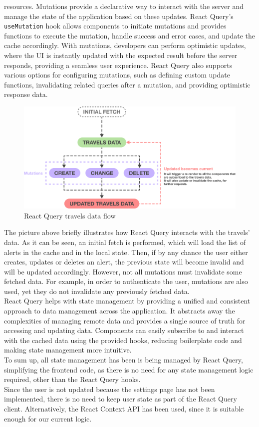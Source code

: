 \documentclass[./memory.tex]{subfiles}
\begin{document}
resources. Mutations provide a declarative way to interact with the server and
manage the state of the application based on these updates. React Query's
\texttt{useMutation} hook allows components to initiate mutations and provides
functions to execute the mutation, handle success and error cases, and update
the cache accordingly. With mutations, developers can perform optimistic
updates, where the UI is instantly updated with the expected result before the
server responds, providing a seamless user experience. React Query also supports
various options for configuring mutations, such as defining custom update
functions, invalidating related queries after a mutation, and providing
optimistic response data.
\begin{figure}[H]
	\centering
	\includegraphics[width=\textwidth]{./assets/react-query-travels.png}
	\caption{React Query travels data flow}
\end{figure}
The picture above briefly illustrates how React Query interacts with the
travels' data. As it can be seen, an initial fetch is performed, which will load
the list of alerts in the cache and in the local state. Then, if by any chance
the user either creates, updates or deletes an alert, the previous state will
become invalid and will be updated accordingly. However, not all mutations must
invalidate some fetched data. For example, in order to authenticate the user,
mutations are also used, yet they do not invalidate any previously fetched data.
\\[8pt]
React Query helps with state management by providing a unified and consistent
approach to data management across the application. It abstracts away the
complexities of managing remote data and provides a single source of truth for
accessing and updating data. Components can easily subscribe to and interact
with the cached data using the provided hooks, reducing boilerplate code and
making state management more intuitive.
\\[8pt]
To sum up, all state management has been is being managed by React Query,
simplifying the frontend code, as there is no need for any state management
logic required, other than the React Query hooks.
\\
Since the user is not updated because the settings page has not been
implemented, there is no need to keep user state as part of the React Query
client. Alternatively, the React Context API has been used, since it is suitable
enough for our current logic.
\end{document}
